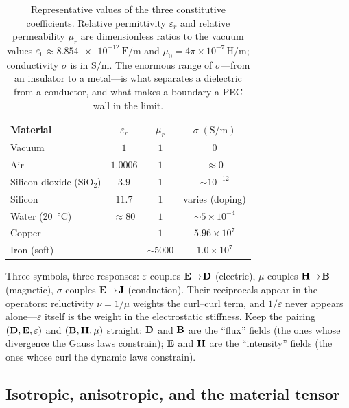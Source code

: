 \begin{table}[t]
\centering
\caption[Typical material parameters]{Representative values of the three
constitutive coefficients. Relative permittivity $\varepsilon_r$ and relative
permeability $\mu_r$ are dimensionless ratios to the vacuum values
$\varepsilon_0\approx\SI{8.854e-12}{\farad\per\meter}$ and
$\mu_0=4\pi\times10^{-7}\,\si{\henry\per\meter}$; conductivity $\sigma$ is in
$\si{\siemens\per\meter}$. The enormous range of $\sigma$---from an insulator
to a metal---is what separates a dielectric from a conductor, and what makes a
boundary a PEC wall in the limit.}
\label{tab:materials}
\small
\setlength{\tabcolsep}{7pt}
\renewcommand{\arraystretch}{1.2}
\begin{tabular}{@{}lccc@{}}
\toprule
Material & $\varepsilon_r$ & $\mu_r$ & $\sigma\;(\si{\siemens\per\meter})$ \\
\midrule
Vacuum             & $1$     & $1$    & $0$ \\
Air                & $1.0006$& $1$    & $\approx 0$ \\
Silicon dioxide (\(\mathrm{SiO_2}\)) & $3.9$ & $1$ & $\sim 10^{-12}$ \\
Silicon            & $11.7$  & $1$    & varies (doping) \\
Water (\SI{20}{\celsius}) & $\approx 80$ & $1$ & $\sim 5\times10^{-4}$ \\
Copper             & ---     & $1$    & $5.96\times10^{7}$ \\
Iron (soft)        & ---     & $\sim 5000$ & $1.0\times10^{7}$ \\
\bottomrule
\end{tabular}
\end{table}

\begin{notationbox}
Three symbols, three responses: $\varepsilon$ couples $\mathbf{E}\!\to\!\mathbf{D}$ (electric),
$\mu$ couples $\mathbf{H}\!\to\!\mathbf{B}$ (magnetic), $\sigma$ couples $\mathbf{E}\!\to\!\mathbf{J}$
(conduction). Their reciprocals appear in the operators: reluctivity
$\nu=1/\mu$ weights the curl--curl term, and $1/\varepsilon$ never appears
alone---$\varepsilon$ itself is the weight in the electrostatic stiffness. Keep
the pairing $(\mathbf{D},\mathbf{E},\varepsilon)$ and $(\mathbf{B},\mathbf{H},\mu)$ straight: $\mathbf{D}$ and
$\mathbf{B}$ are the ``flux'' fields (the ones whose divergence the Gauss laws
constrain); $\mathbf{E}$ and $\mathbf{H}$ are the ``intensity'' fields (the ones whose curl
the dynamic laws constrain).
\end{notationbox}

\subsection{Isotropic, anisotropic, and the material tensor}

